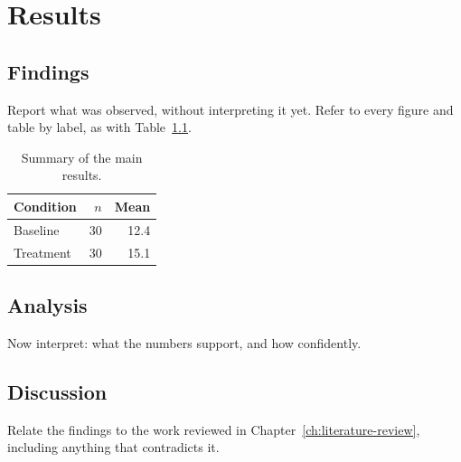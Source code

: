 \chapter{Results}
\label{ch:results}

\section{Findings}

Report what was observed, without interpreting it yet. Refer to every
figure and table by label, as with Table~\ref{tab:thesis-results}.

\begin{table}[htbp]
    \centering
    \begin{tabular}{lrr}
        \toprule
        Condition & $n$ & Mean \\
        \midrule
        Baseline  & 30  & 12.4 \\
        Treatment & 30  & 15.1 \\
        \bottomrule
    \end{tabular}
    \caption{Summary of the main results.}
    \label{tab:thesis-results}
\end{table}

\section{Analysis}

Now interpret: what the numbers support, and how confidently.

\section{Discussion}

Relate the findings to the work reviewed in
Chapter~\ref{ch:literature-review}, including anything that contradicts
it.
